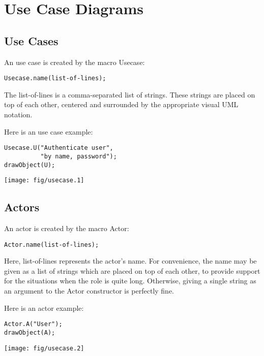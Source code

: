 \documentclass{article}
\newcommand{\code}{\ttfamily}
\begin{document}
\section{Use Case Diagrams}

\subsection{Use Cases}
An use case is created by the macro {\code Usecase}:

\begin{verbatim}
Usecase.name(list-of-lines);
\end{verbatim}

The {\code list-of-lines} is a comma-separated list of strings. These strings are placed
on top of each other, centered and surrounded by the appropriate visual UML notation.

Here is an use case example:

\begin{multicols}{2}
\begin{verbatim}
Usecase.U("Authenticate user",
          "by name, password");
drawObject(U);
\end{verbatim}
\columnbreak
\hspace{1cm}\texttt{[image: fig/usecase.1]}
\end{multicols}

\subsection{Actors}

An actor is created by the macro {\code Actor}:

\begin{verbatim}
Actor.name(list-of-lines);
\end{verbatim}

Here, {\code list-of-lines} represents the actor's name. For convenience, the name may be
given as a list of strings which are placed on top of each other, to provide support for
the situations when the role is quite long. Otherwise, giving a single string
as an argument to the Actor constructor is perfectly fine.

Here is an actor example:

\begin{multicols}{2}
\begin{verbatim}
Actor.A("User");
drawObject(A);
\end{verbatim}
\columnbreak
\hspace{1cm}\texttt{[image: fig/usecase.2]}
\end{multicols}
\end{document}
